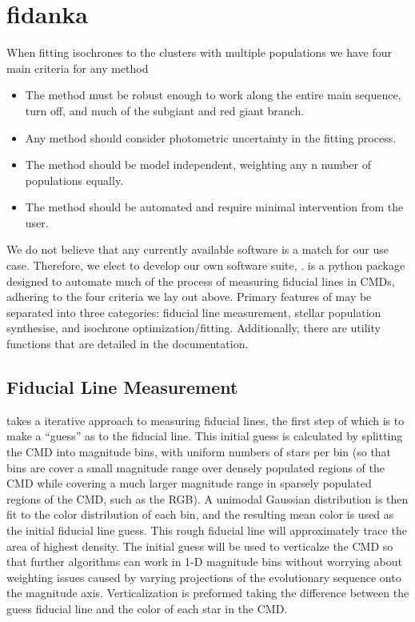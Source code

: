 \section{fidanka}\label{sec:fidanka}
When fitting isochrones to the clusters with multiple populations we have four
main criteria for any method

\begin{itemize}
  \item The method must be robust enough to work along the entire main
    sequence, turn off, and much of the subgiant and red giant branch.
	\item Any method should consider photometric uncertainty in the fitting process.
	\item The method should be model independent, weighting any n number of populations equally.
	\item The method should be automated and require minimal intervention from the user.
\end{itemize}


We do not believe that any currently available software is a match for
our use case. Therefore, we elect to develop our own software suite, \fidanka.
\fidanka is a python package designed to automate much of the process of
measuring fiducial lines in CMDs, adhering to the four criteria we lay out
above. Primary features of \fidanka may be separated into three
categories: fiducial line measurement, stellar population synthesise, and
isochrone optimization/fitting. Additionally, there are utility functions that
are detailed in the \fidanka documentation.

\subsection{Fiducial Line Measurement}
\fidanka takes a iterative approach to measuring fiducial lines, the first step
of which is to make a ``guess'' as to the fiducial line. This initial guess
is calculated by splitting the CMD into magnitude bins, with uniform numbers of
stars per bin (so that bins are cover a small magnitude range over densely
populated regions of the CMD while covering a much larger magnitude range in
sparsely populated regions of the CMD, such as the RGB). A unimodal Gaussian
distribution is then fit to the color distribution of each bin, and the
resulting mean color is used as the initial fiducial line guess. This rough
fiducial line will approximately trace the area of highest density. The initial
guess will be used to verticalze the CMD so that further algorithms can work in
1-D magnitude bins without worrying about weighting issues caused by varying
projections of the evolutionary sequence onto the magnitude axis.
Verticalization is preformed taking the difference between the guess fiducial
line and the color of each star in the CMD.

